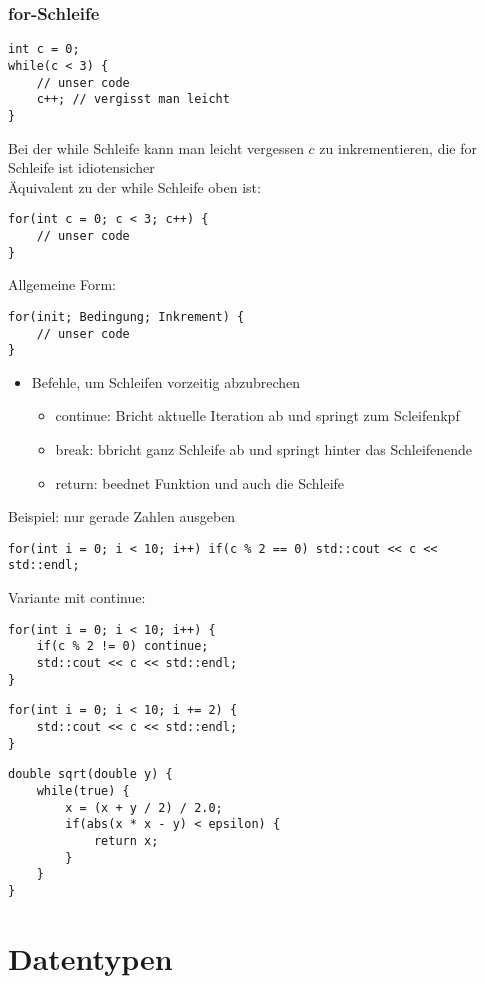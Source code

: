 \documentclass[a4paper]{scrartcl}
\begin{document}
\subsubsection{for-Schleife}
\label{sec-8-2-6}
\begin{verbatim}
int c = 0;
while(c < 3) {
	// unser code
	c++; // vergisst man leicht
}
\end{verbatim}

Bei der while Schleife kann man leicht vergessen $c$ zu inkrementieren, die for Schleife ist idiotensicher \\
    Äquivalent zu der while Schleife oben ist:
\begin{verbatim}
for(int c = 0; c < 3; c++) {
	// unser code
}
\end{verbatim}

Allgemeine Form:
\begin{verbatim}
for(init; Bedingung; Inkrement) {
	// unser code
}
\end{verbatim}
\begin{itemize}
\item Befehle, um Schleifen vorzeitig abzubrechen
\begin{itemize}
\item continue: Bricht aktuelle Iteration ab und springt zum Scleifenkpf
\item break: bbricht ganz Schleife ab und springt hinter das Schleifenende
\item return: beednet Funktion und auch die Schleife
\end{itemize}
\end{itemize}
Beispiel: nur gerade Zahlen ausgeben
\begin{verbatim}
for(int i = 0; i < 10; i++) if(c % 2 == 0) std::cout << c << std::endl;
\end{verbatim}
Variante mit continue:
\begin{verbatim}
for(int i = 0; i < 10; i++) {
	if(c % 2 != 0) continue;
	std::cout << c << std::endl;
}
\end{verbatim}

\begin{verbatim}
for(int i = 0; i < 10; i += 2) {
	std::cout << c << std::endl;
}
\end{verbatim}
\begin{verbatim}
double sqrt(double y) {
	while(true) {
		x = (x + y / 2) / 2.0;
		if(abs(x * x - y) < epsilon) {
			return x;
		}
	}
}
\end{verbatim}

\section{Datentypen}
\label{sec-9}
\end{document}
